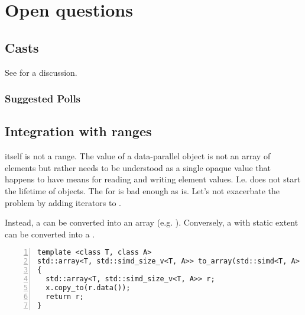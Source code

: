 \section{Open questions}

\subsection{Casts}\label{sec:question-casts}

See  for a discussion.

\subsubsection{Suggested Polls}



\subsection{Integration with ranges}
 itself is not a range.
The value of a data-parallel object is not an array of elements but rather needs to be understood as a single opaque value that happens to have means for reading and writing element values.
I.e.  does not start the lifetime of  objects.
The  for  is bad enough as is.
Let's not exacerbate the problem by adding iterators to .

Instead, a  can be converted into an array (e.g. ).
Conversely, a \std{} with static extent can be converted into a \std{}.
\begin{lstlisting}[numbers=left,float={hbtp},label=lst:simdtoarray,caption={
  \code{simd} to \code{array} conversion
}]
template <class T, class A>
std::array<T, std::simd_size_v<T, A>> to_array(std::simd<T, A> x)
{
  std::array<T, std::simd_size_v<T, A>> r;
  x.copy_to(r.data());
  return r;
}
\end{lstlisting}

